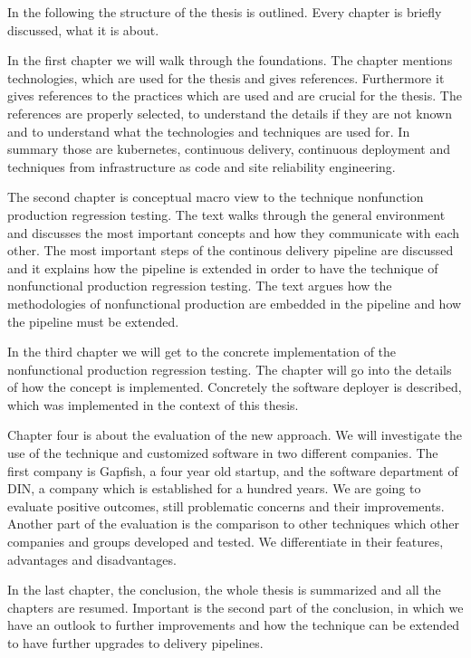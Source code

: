 In the following the structure of the thesis is outlined. Every chapter is briefly
discussed, what it is about.

In the first chapter we will walk through the foundations. The chapter mentions
technologies, which are used for the thesis and gives references. Furthermore it gives
references to the practices which are used and are crucial for the thesis. The references
are properly selected, to understand the details if they are not known and to understand
what the technologies and techniques are used for. In summary those are kubernetes,
continuous delivery, continuous deployment and techniques from infrastructure as code and
site reliability engineering.

The second chapter is conceptual macro view to the technique nonfunction production
regression testing. The text walks through the general environment and discusses the most
important concepts and how they communicate with each other. The most important steps of
the continous delivery pipeline are discussed and it explains how the pipeline is extended
in order to have the technique of nonfunctional production regression testing. The text
argues how the methodologies of nonfunctional production are embedded in the pipeline and
how the pipeline must be extended.

In the third chapter we will get to the concrete implementation of the nonfunctional
production regression testing. The chapter will go into the details of how the concept is
implemented. Concretely the software deployer is described, which was implemented in the
context of this thesis.

Chapter four is about the evaluation of the new approach. We will investigate the use of
the technique and customized software in two different companies. The first company is
Gapfish, a four year old startup, and the software department of DIN, a company which is
established for a hundred years. We are going to evaluate positive outcomes, still
problematic concerns and their improvements. Another part of the evaluation is the
comparison to other techniques which other companies and groups developed and tested. We
differentiate in their features, advantages and disadvantages.

In the last chapter, the conclusion, the whole thesis is summarized and all the chapters
are resumed. Important is the second part of the conclusion, in which we have an outlook
to further improvements and how the technique can be extended to have further upgrades to
delivery pipelines.

